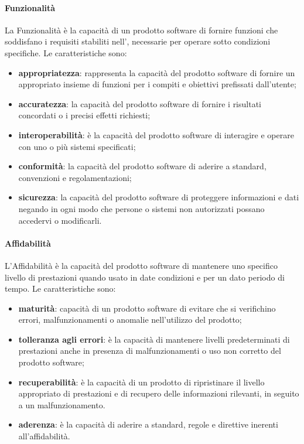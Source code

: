 \paragraph{Funzionalità}
La Funzionalità è la capacità di un prodotto software di fornire funzioni che soddisfano i requisiti stabiliti nell', necessarie per operare sotto condizioni specifiche.
Le caratteristiche sono:
\begin{itemize}
\item \textbf{appropriatezza}: rappresenta la capacità del prodotto software di fornire un appropriato insieme di funzioni per i compiti e obiettivi prefissati dall'utente;
\item \textbf{accuratezza}: la capacità del prodotto software di fornire i risultati concordati o i precisi effetti richiesti;
\item \textbf{interoperabilità}: è la capacità del prodotto software di interagire e operare con uno o più sistemi specificati;
\item \textbf{conformità}: la capacità del prodotto software di aderire a standard, convenzioni e regolamentazioni;
\item \textbf{sicurezza}: la capacità del prodotto software di proteggere informazioni e dati negando in ogni modo che persone o sistemi non autorizzati possano accedervi o modificarli.
\end{itemize}

\paragraph{Affidabilità}
L'Affidabilità è la capacità del prodotto software di mantenere uno specifico livello di prestazioni quando usato in date condizioni e per un dato periodo di tempo. Le caratteristiche sono:
\begin{itemize}
\item \textbf{maturità}: capacità di un prodotto software di evitare che si verifichino errori, malfunzionamenti o anomalie nell'utilizzo del prodotto;
\item \textbf{tolleranza agli errori}: è la capacità di mantenere livelli predeterminati di prestazioni anche in presenza di malfunzionamenti o uso non corretto del prodotto software;
\item \textbf{recuperabilità}: è la capacità di un prodotto di ripristinare il livello appropriato di prestazioni e di recupero delle informazioni rilevanti, in seguito a un malfunzionamento.
\item \textbf{aderenza}: è la capacità di aderire a standard, regole e direttive inerenti all'affidabilità.
\end{itemize}

